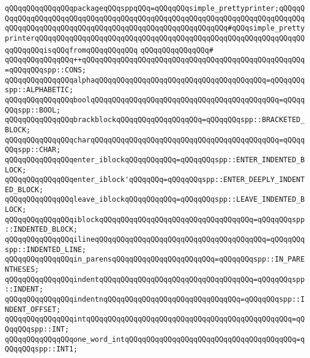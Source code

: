\verb|qQQqqQQqqQQqqQQqpackageqQQqsppqQQq=qQQqqQQqsimple_prettyprinter;qQQqqQQqqQQqqQQqqQQqqQQqqQQqqQQqqQQqqQQqqQQqqQQqqQQqqQQqqQQqqQQqqQQqqQQqqQQqqQQqqQQqqQQqqQQqqQQqqQQqqQQqqQQqqQQqqQQqqQQqqQQqqQQq#qQQqsimple_prettyprinterqQQqqQQqqQQqqQQqqQQqqQQqqQQqqQQqqQQqqQQqqQQqqQQqqQQqqQQqqQQqqQQqqQQqqQQqisqQQqfromqQQqqQQqqQQq|\newline
\verb|qQQqqQQqqQQqqQQq#|\newline
\verb|qQQqqQQqqQQqqQQq++qQQqqQQqqQQqqQQqqQQqqQQqqQQqqQQqqQQqqQQqqQQqqQQqqQQq=qQQqqQQqspp::CONS;|\newline
\verb|qQQqqQQqqQQqqQQqalphaqQQqqQQqqQQqqQQqqQQqqQQqqQQqqQQqqQQqqQQq=qQQqqQQqspp::ALPHABETIC;|\newline
\verb|qQQqqQQqqQQqqQQqboolqQQqqQQqqQQqqQQqqQQqqQQqqQQqqQQqqQQqqQQqqQQq=qQQqqQQqspp::BOOL;|\newline
\verb|qQQqqQQqqQQqqQQqbrackblockqQQqqQQqqQQqqQQqqQQq=qQQqqQQqspp::BRACKETED_BLOCK;|\newline
\verb|qQQqqQQqqQQqqQQqcharqQQqqQQqqQQqqQQqqQQqqQQqqQQqqQQqqQQqqQQqqQQq=qQQqqQQqspp::CHAR;|\newline
\verb|qQQqqQQqqQQqqQQqenter_iblockqQQqqQQqqQQq=qQQqqQQqspp::ENTER_INDENTED_BLOCK;|\newline
\verb|qQQqqQQqqQQqqQQqenter_iblock'qQQqqQQq=qQQqqQQqspp::ENTER_DEEPLY_INDENTED_BLOCK;|\newline
\verb|qQQqqQQqqQQqqQQqleave_iblockqQQqqQQqqQQq=qQQqqQQqspp::LEAVE_INDENTED_BLOCK;|\newline
\verb|qQQqqQQqqQQqqQQqiblockqQQqqQQqqQQqqQQqqQQqqQQqqQQqqQQqqQQq=qQQqqQQqspp::INDENTED_BLOCK;|\newline
\verb|qQQqqQQqqQQqqQQqilineqQQqqQQqqQQqqQQqqQQqqQQqqQQqqQQqqQQqqQQq=qQQqqQQqspp::INDENTED_LINE;|\newline
\verb|qQQqqQQqqQQqqQQqin_parensqQQqqQQqqQQqqQQqqQQqqQQq=qQQqqQQqspp::IN_PARENTHESES;|\newline
\verb|qQQqqQQqqQQqqQQqindentqQQqqQQqqQQqqQQqqQQqqQQqqQQqqQQqqQQq=qQQqqQQqspp::INDENT;|\newline
\verb|qQQqqQQqqQQqqQQqindentnqQQqqQQqqQQqqQQqqQQqqQQqqQQqqQQq=qQQqqQQqspp::INDENT_OFFSET;|\newline
\verb|qQQqqQQqqQQqqQQqintqQQqqQQqqQQqqQQqqQQqqQQqqQQqqQQqqQQqqQQqqQQqqQQq=qQQqqQQqspp::INT;|\newline
\verb|qQQqqQQqqQQqqQQqone_word_intqQQqqQQqqQQqqQQqqQQqqQQqqQQqqQQqqQQqqQQq=qQQqqQQqspp::INT1;|\newline
